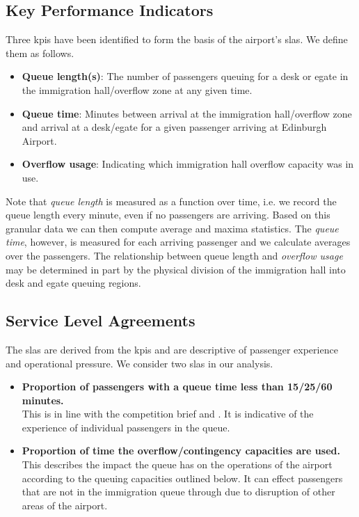 \documentclass[10pt]{article}
\begin{document}
\subsection{Key Performance Indicators}

Three \glspl{kpi} have been identified to form the basis of the airport's \glspl{sla}. We define them as follows.

\begin{itemize}
    \item \textbf{Queue length(s)}: The number of passengers queuing for a desk or \gls{egate} in the immigration hall/overflow zone at any given time.
    \item \textbf{Queue time}: Minutes between arrival at the immigration hall/overflow zone and arrival at a desk/\gls{egate} for a given passenger arriving at Edinburgh Airport. 
    \item \textbf{Overflow usage}: Indicating which immigration hall overflow capacity was in use.
\end{itemize}

Note that \textit{queue length} is measured as a function over time, i.e. we record the queue length every minute, even if no passengers are arriving. Based on this granular data we can then compute average and maxima statistics. The \textit{queue time}, however, is measured for each arriving passenger and we calculate averages over the passengers. The relationship between queue length and \textit{overflow usage} may be determined in part by the physical division of the immigration hall into desk and \gls{egate} queuing regions.

\subsection{Service Level Agreements}
The \glspl{sla} are derived from the \glspl{kpi} and are descriptive of passenger experience and operational pressure. We consider two \glspl{sla} in our analysis.
\begin{itemize}
    \item \textbf{Proportion of passengers with a queue time less than 15/25/60 minutes.} \\
    This is in line with the competition brief and \cite{UK_border_2025}. It is indicative of the experience of individual passengers in the queue.
    \item \textbf{ Proportion of time the overflow/contingency capacities are used.} \\
    This describes the impact the queue has on the operations of the airport according to the queuing capacities outlined below. It can effect passengers that are not in the immigration queue through due to disruption of other areas of the airport.
\end{itemize}
\end{document}
